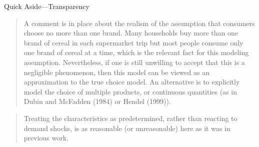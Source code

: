 \documentclass[dvipsnames]{beamer}
\begin{document}
%
 \begin{frame}{Quick Aside---Transparency}
  \begin{quote} 
    A comment is in place about the realism of the assumption that consumers choose no more
than one brand. Many households buy more than one brand of cereal in each supermarket trip but
most people consume only one brand of cereal at a time, which is the relevant fact for this modeling
assumption. Nevertheless, if one is still unwilling to accept that this is a negligible phenomenon, then
this model can be viewed as an approximation to the true choice model. An alternative is to
explicitly model the choice of multiple products, or continuous quantities
(as in Dubin and McFadden (1984) or Hendel (1999)).
\end{quote}
\begin{quote}
  Treating the characteristics as predetermined, rather than reacting to demand
shocks, is as reasonable
(or unreasonable)
here as it was in previous work.
\end{quote}
 \end{frame}
\end{document}

